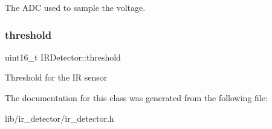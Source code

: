 The A\+DC used to sample the voltage. \hypertarget{class_i_r_detector_a81b7870332a3ca41a391c95d5c3f60e4}{}\label{class_i_r_detector_a81b7870332a3ca41a391c95d5c3f60e4} 
\subsubsection{\texorpdfstring{threshold}{threshold}}
{\footnotesize\ttfamily uint16\+\_\+t I\+R\+Detector\+::threshold\hspace{0.3cm}{\ttfamily [private]}}

Threshold for the IR sensor 

The documentation for this class was generated from the following file\+:\begin{DoxyCompactItemize}
\item 
lib/ir\+\_\+detector/ir\+\_\+detector.\+h\end{DoxyCompactItemize}

